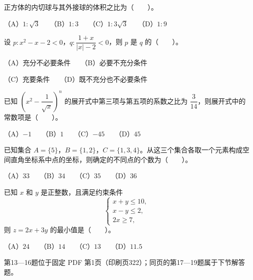 \begin{question}
正方体的内切球与其外接球的体积之比为\mbox{（　　）}。

（A）$1:\sqrt3$　　（B）$1:3$　　（C）$1:3\sqrt3$　　（D）$1:9$

\end{question}
\begin{question}
设 $p\colon x^2-x-2<0$，$q\colon\dfrac{1+x}{|x|-2}<0$，则 $p$ 是 $q$ 的\mbox{（　　）}。

（A）充分不必要条件　　（B）必要不充分条件

（C）充要条件　　（D）既不充分也不必要条件

\end{question}
\begin{question}
已知 $\left(x^2-\dfrac1{\sqrt{x}}\right)^n$ 的展开式中第三项与第五项的系数之比为 $\dfrac3{14}$，则展开式中的常数项是\mbox{（　　）}。

（A）$-1$　　（B）$1$　　（C）$-45$　　（D）$45$

\end{question}
\begin{question}
已知集合 $A=\{5\}$，$B=\{1,2\}$，$C=\{1,3,4\}$。从这三个集合各取一个元素构成空间直角坐标系中点的坐标，则确定的不同点的个数为\mbox{（　　）}。

（A）$33$　　（B）$34$　　（C）$35$　　（D）$36$

\end{question}
\begin{question}
已知 $x$ 和 $y$ 是正整数，且满足约束条件
\nopagebreak[4]
\[
\begin{cases}
x+y\le 10,\\
x-y\le 2,\\
2x\ge 7,
\end{cases}
\]
则 $z=2x+3y$ 的最小值是\mbox{（　　）}。

（A）$24$　　（B）$14$　　（C）$13$　　（D）$11.5$

\end{question}

\begin{gktip}
第13—16题位于固定 PDF 第1页（印刷页322）；同页的第17—19题属于下节解答题。
\end{gktip}


